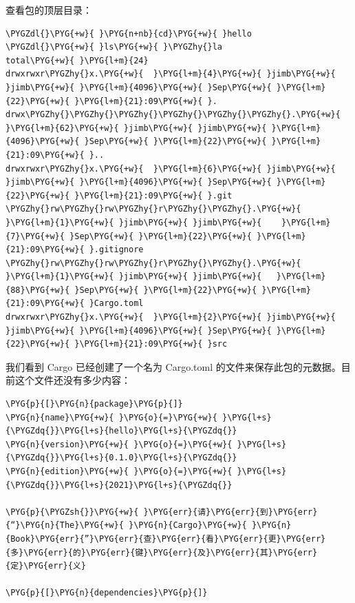 查看包的顶层目录：

\begin{Verbatim}[commandchars=\\\{\},breaklines=true,breakanywhere=true,fontsize=\codefont,xleftmargin=17bp]
\PYGZdl{}\PYG{+w}{ }\PYG{n+nb}{cd}\PYG{+w}{ }hello
\PYGZdl{}\PYG{+w}{ }ls\PYG{+w}{ }\PYGZhy{}la
total\PYG{+w}{ }\PYG{l+m}{24}
drwxrwxr\PYGZhy{}x.\PYG{+w}{  }\PYG{l+m}{4}\PYG{+w}{ }jimb\PYG{+w}{ }jimb\PYG{+w}{ }\PYG{l+m}{4096}\PYG{+w}{ }Sep\PYG{+w}{ }\PYG{l+m}{22}\PYG{+w}{ }\PYG{l+m}{21}:09\PYG{+w}{ }.
drwx\PYGZhy{}\PYGZhy{}\PYGZhy{}\PYGZhy{}\PYGZhy{}\PYGZhy{}.\PYG{+w}{ }\PYG{l+m}{62}\PYG{+w}{ }jimb\PYG{+w}{ }jimb\PYG{+w}{ }\PYG{l+m}{4096}\PYG{+w}{ }Sep\PYG{+w}{ }\PYG{l+m}{22}\PYG{+w}{ }\PYG{l+m}{21}:09\PYG{+w}{ }..
drwxrwxr\PYGZhy{}x.\PYG{+w}{  }\PYG{l+m}{6}\PYG{+w}{ }jimb\PYG{+w}{ }jimb\PYG{+w}{ }\PYG{l+m}{4096}\PYG{+w}{ }Sep\PYG{+w}{ }\PYG{l+m}{22}\PYG{+w}{ }\PYG{l+m}{21}:09\PYG{+w}{ }.git
\PYGZhy{}rw\PYGZhy{}rw\PYGZhy{}r\PYGZhy{}\PYGZhy{}.\PYG{+w}{  }\PYG{l+m}{1}\PYG{+w}{ }jimb\PYG{+w}{ }jimb\PYG{+w}{    }\PYG{l+m}{7}\PYG{+w}{ }Sep\PYG{+w}{ }\PYG{l+m}{22}\PYG{+w}{ }\PYG{l+m}{21}:09\PYG{+w}{ }.gitignore
\PYGZhy{}rw\PYGZhy{}rw\PYGZhy{}r\PYGZhy{}\PYGZhy{}.\PYG{+w}{  }\PYG{l+m}{1}\PYG{+w}{ }jimb\PYG{+w}{ }jimb\PYG{+w}{   }\PYG{l+m}{88}\PYG{+w}{ }Sep\PYG{+w}{ }\PYG{l+m}{22}\PYG{+w}{ }\PYG{l+m}{21}:09\PYG{+w}{ }Cargo.toml
drwxrwxr\PYGZhy{}x.\PYG{+w}{  }\PYG{l+m}{2}\PYG{+w}{ }jimb\PYG{+w}{ }jimb\PYG{+w}{ }\PYG{l+m}{4096}\PYG{+w}{ }Sep\PYG{+w}{ }\PYG{l+m}{22}\PYG{+w}{ }\PYG{l+m}{21}:09\PYG{+w}{ }src
\end{Verbatim}

我们看到 Cargo 已经创建了一个名为 Cargo.toml 的文件来保存此包的元数据。目前这个文件还没有多少内容：

\begin{Verbatim}[commandchars=\\\{\},breaklines=true,breakanywhere=true,fontsize=\codefont,xleftmargin=17bp]
\PYG{p}{[}\PYG{n}{package}\PYG{p}{]}
\PYG{n}{name}\PYG{+w}{ }\PYG{o}{=}\PYG{+w}{ }\PYG{l+s}{\PYGZdq{}}\PYG{l+s}{hello}\PYG{l+s}{\PYGZdq{}}
\PYG{n}{version}\PYG{+w}{ }\PYG{o}{=}\PYG{+w}{ }\PYG{l+s}{\PYGZdq{}}\PYG{l+s}{0.1.0}\PYG{l+s}{\PYGZdq{}}
\PYG{n}{edition}\PYG{+w}{ }\PYG{o}{=}\PYG{+w}{ }\PYG{l+s}{\PYGZdq{}}\PYG{l+s}{2021}\PYG{l+s}{\PYGZdq{}}

\PYG{p}{\PYGZsh{}}\PYG{+w}{ }\PYG{err}{请}\PYG{err}{到}\PYG{err}{“}\PYG{n}{The}\PYG{+w}{ }\PYG{n}{Cargo}\PYG{+w}{ }\PYG{n}{Book}\PYG{err}{”}\PYG{err}{查}\PYG{err}{看}\PYG{err}{更}\PYG{err}{多}\PYG{err}{的}\PYG{err}{键}\PYG{err}{及}\PYG{err}{其}\PYG{err}{定}\PYG{err}{义}

\PYG{p}{[}\PYG{n}{dependencies}\PYG{p}{]}
\end{Verbatim}

